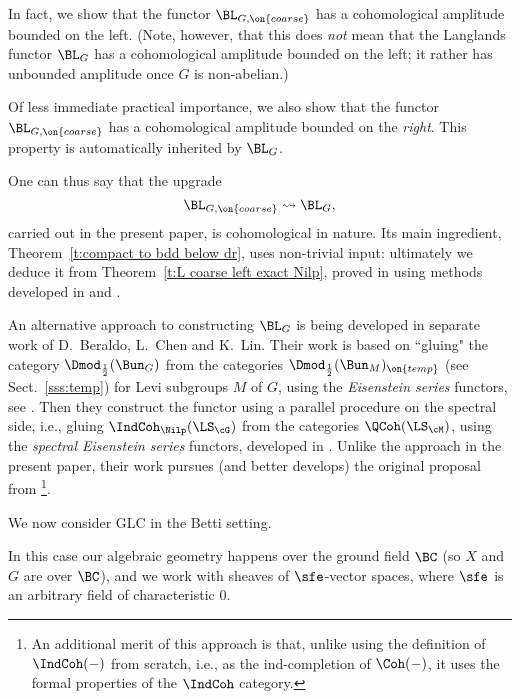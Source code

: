 \documentclass[9pt]{amsart}
\theoremstyle{remark}
\theoremstyle{definition}
\theoremstyle{remark}
\newcommand{\thmref}[1]{Theorem~\ref{#1}}
\newcommand{\secref}[1]{Sect.~\ref{#1}}
\numberwithin{equation}{section}
\begin{document}
\medskip

In fact, we show that the functor $\BL_{G,\on{coarse}}$ has a cohomological amplitude bounded on the left. (Note, however,
that this does \emph{not} mean that the Langlands functor $\BL_G$ has a cohomological amplitude bounded on the left; it rather has 
unbounded amplitude once $G$ is non-abelian.)

\medskip

Of less immediate practical importance, we also show that the functor $\BL_{G,\on{coarse}}$ has a 
cohomological amplitude bounded on the \emph{right}. This property is automatically inherited by $\BL_G$. 

\sssec{}

One can thus say that the upgrade 
\begin{equation} \label{e:upgrade}
\BL_{G,\on{coarse}}\rightsquigarrow \BL_G,
\end{equation}
carried out in the present paper, is cohomological in nature. Its main 
ingredient, \thmref{t:compact to bdd below dr}, 
uses non-trivial input: ultimately we deduce it from 
\thmref{t:L coarse left exact Nilp}, proved in \cite{FR} using methods developed
in \cite{AGKRRV} and \cite{Lin}.

\medskip

An alternative approach to constructing $\BL_G$ is being 
developed in separate work of D.~Beraldo, L.~Chen and K.~Lin. 
Their work is based on ``gluing" the category $\Dmod_{\frac{1}{2}}(\Bun_G)$
from the categories $\Dmod_{\frac{1}{2}}(\Bun_M)_{\on{temp}}$ (see \secref{sss:temp}) for Levi subgroups $M$ of $G$, using the
\emph{Eisenstein series} functors, see \cite{BeLi}.
Then they construct the functor using a parallel procedure 
on the spectral side, i.e., gluing 
$\IndCoh_\Nilp(\LS_\cG)$ from the categories $\QCoh(\LS_\cM)$, using the
\emph{spectral Eisenstein series} functors, developed in \cite{Be2}. Unlike the approach in the present
paper, their work pursues (and better develops) the original proposal 
from \cite{Ga2}\footnote{An additional merit of this approach is that, unlike using the definition of $\IndCoh(-)$ from scratch, i.e., as the ind-completion
of $\Coh(-)$, it uses the formal properties of the $\IndCoh$ category.}.


We now consider GLC in the Betti setting. 

\sssec{}

In this case our algebraic geometry happens over the ground field $\BC$
(so $X$ and $G$ are over $\BC$), and we work with sheaves of $\sfe$-vector spaces, where $\sfe$ is an arbitrary
field of characteristic $0$. 
\end{document}
